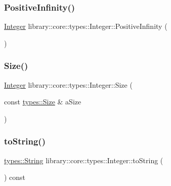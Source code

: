\mbox{\label{classlibrary_1_1core_1_1types_1_1_integer_a807320f164c841288eafff5f49470c00}} 
\subsubsection{\texorpdfstring{PositiveInfinity()}{PositiveInfinity()}}
{\footnotesize\ttfamily \mbox{\hyperlink{classlibrary_1_1core_1_1types_1_1_integer}{Integer}} library\+::core\+::types\+::\+Integer\+::\+Positive\+Infinity (\begin{DoxyParamCaption}{ }\end{DoxyParamCaption})\hspace{0.3cm}{\ttfamily [static]}}

\mbox{\label{classlibrary_1_1core_1_1types_1_1_integer_a42a312defba217d122aa51b9cb46940c}} 
\subsubsection{\texorpdfstring{Size()}{Size()}}
{\footnotesize\ttfamily \mbox{\hyperlink{classlibrary_1_1core_1_1types_1_1_integer}{Integer}} library\+::core\+::types\+::\+Integer\+::\+Size (\begin{DoxyParamCaption}\item[{const \mbox{\hyperlink{namespacelibrary_1_1core_1_1types_a701626ea1027888ebbb8cfd0ff7adab0}{types\+::\+Size}} \&}]{a\+Size }\end{DoxyParamCaption})\hspace{0.3cm}{\ttfamily [static]}}

\mbox{\label{classlibrary_1_1core_1_1types_1_1_integer_a000d4725230ff312cd64e0f7f4ca2ad0}} 
\subsubsection{\texorpdfstring{toString()}{toString()}}
{\footnotesize\ttfamily \mbox{\hyperlink{classlibrary_1_1core_1_1types_1_1_string}{types\+::\+String}} library\+::core\+::types\+::\+Integer\+::to\+String (\begin{DoxyParamCaption}{ }\end{DoxyParamCaption}) const}

